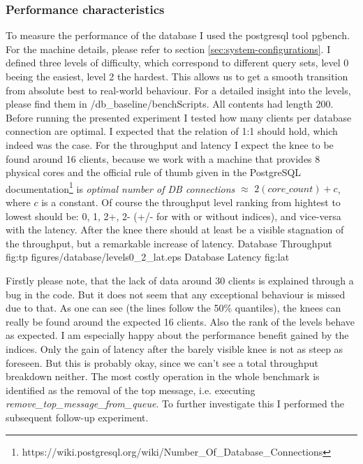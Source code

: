 \documentclass[11pt]{article}
\begin{document}
\subsubsection{Performance characteristics}\label{sec:performance-characteristics}
To measure the performance of the database I used the postgresql tool pgbench. For the machine details, please refer to section \ref{sec:system-configurations}. I defined three levels of difficulty, which correspond to different query sets, level 0 beeing the easiest, level 2 the hardest. This allows us to get a smooth transition from absolute best to real-world behaviour. For a detailed insight into the levels, please find them in /db\_baseline/benchScripts. All contents had length 200. Before running the presented experiment I tested how many clients per database connection are optimal. I expected that the relation of 1:1 should hold, which indeed was the case. For the throughput and latency I expect the knee to be found around 16 clients, because we work with a machine that provides 8 physical cores and the official rule of thumb given in the PostgreSQL documentation\footnote[1]{https://wiki.postgresql.org/wiki/Number\_Of\_Database\_Connections} is \textit{optimal number of DB connections} $\approx$ $2(core\_count)+c$, where $c$ is a constant. Of course the throughput level ranking from hightest to lowest should be: 0, 1, 2+, 2- (+/- for with or without indices), and vice-versa with the latency. After the knee there should at least be a visible stagnation of the throughput, but a remarkable increase of latency.
 {Database Throughput} {fig:tp}
		{figures/database/levels0_2_lat.eps} {Database Latency} {fig:lat}

Firstly please note, that the lack of data around 30 clients is explained through a bug in the code. But it does not seem that any exceptional behaviour is missed due to that. As one can see (the lines follow the 50\% quantiles), the knees can really be found around the expected 16 clients. Also the rank of the levels behave as expected. I am especially happy about the performance benefit gained by the indices. Only the gain of latency after the barely visible knee is not as steep as foreseen. But this is probably okay, since we can't see a total throughput breakdown neither. The most costly operation in the whole benchmark is identified as the removal of the top message, i.e. executing \textit{remove\_top\_message\_from\_queue}. To further investigate this I performed the subsequent follow-up experiment.
\end{document}
